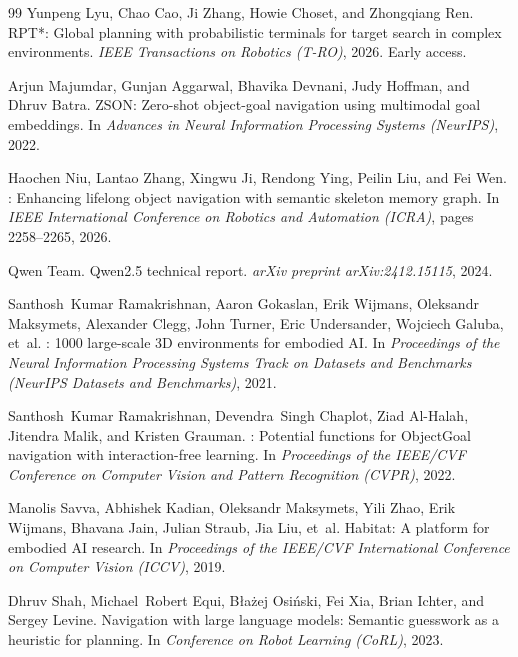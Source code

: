 \documentclass[10pt]{article}
\begin{document}
\begin{thebibliography}{99}
Yunpeng Lyu, Chao Cao, Ji Zhang, Howie Choset, and Zhongqiang Ren.
\newblock RPT*: Global planning with probabilistic terminals for target search in complex environments.
\newblock \emph{IEEE Transactions on Robotics (T-RO)}, 2026.
\newblock Early access.

Arjun Majumdar, Gunjan Aggarwal, Bhavika Devnani, Judy Hoffman, and Dhruv Batra.
\newblock ZSON: Zero-shot object-goal navigation using multimodal goal embeddings.
\newblock In \emph{Advances in Neural Information Processing Systems (NeurIPS)}, 2022.

Haochen Niu, Lantao Zhang, Xingwu Ji, Rendong Ying, Peilin Liu, and Fei Wen.
: Enhancing lifelong object navigation with semantic skeleton memory graph.
\newblock In \emph{IEEE International Conference on Robotics and Automation (ICRA)}, pages 2258--2265, 2026.

Qwen Team.
\newblock Qwen2.5 technical report.
\newblock \emph{arXiv preprint arXiv:2412.15115}, 2024.

Santhosh~Kumar Ramakrishnan, Aaron Gokaslan, Erik Wijmans, Oleksandr Maksymets, Alexander Clegg, John Turner, Eric Undersander, Wojciech Galuba, et~al.
: 1000 large-scale {3D} environments for embodied {AI}.
\newblock In \emph{Proceedings of the Neural Information Processing Systems Track on Datasets and Benchmarks (NeurIPS Datasets and Benchmarks)}, 2021.

Santhosh~Kumar Ramakrishnan, Devendra~Singh Chaplot, Ziad Al-Halah, Jitendra Malik, and Kristen Grauman.
: Potential functions for {ObjectGoal} navigation with interaction-free learning.
\newblock In \emph{Proceedings of the IEEE/CVF Conference on Computer Vision and Pattern Recognition (CVPR)}, 2022.

Manolis Savva, Abhishek Kadian, Oleksandr Maksymets, Yili Zhao, Erik Wijmans, Bhavana Jain, Julian Straub, Jia Liu, et~al.
\newblock Habitat: A platform for embodied {AI} research.
\newblock In \emph{Proceedings of the IEEE/CVF International Conference on Computer Vision (ICCV)}, 2019.

Dhruv Shah, Michael~Robert Equi, B{\l}a{\.z}ej Osi{\'n}ski, Fei Xia, Brian Ichter, and Sergey Levine.
\newblock Navigation with large language models: Semantic guesswork as a heuristic for planning.
\newblock In \emph{Conference on Robot Learning (CoRL)}, 2023.


\end{thebibliography}
\end{document}
